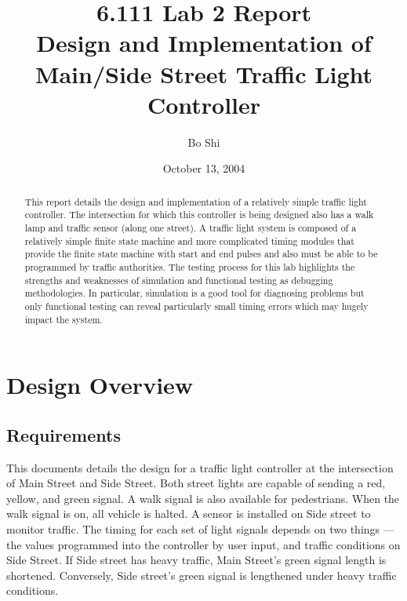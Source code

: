 \documentclass[12pt]{article}
\author{Bo Shi}
\title{6.111 Lab 2 Report \\ Design and Implementation of Main/Side Street Traffic Light Controller}
\date{October 13, 2004}
\begin{document}
\begin{titlepage}
\pagestyle{empty}
\maketitle

\begin{abstract}
This report details the design and implementation of a relatively simple
traffic light controller.  The intersection for which this controller is being
designed also has a walk lamp and traffic sensor (along one street).  A traffic
light system is composed of a relatively simple finite state machine and more
complicated timing modules that provide the finite state machine with start and
end pulses and also must be able to be programmed by traffic authorities.  The
testing process for this lab highlights the strengths and weaknesses of
simulation and functional testing as debugging methodologies.  In particular,
simulation is a good tool for diagnosing problems but only functional testing
can reveal particularly small timing errors which may hugely impact the system.
\end{abstract}
\end{titlepage}


\pagestyle{plain}
\setcounter{page}{1}
\tableofcontents

\newpage
\listoffigures 
\listoftables 

\newpage
{}
\setcounter{page}{1}
\section{Design Overview}
	\subsection{Requirements}
	This documents details the design for a traffic light controller at the
	intersection of Main Street and Side Street.  Both street lights are
	capable of sending a red, yellow, and green signal.  A walk signal is also
	available for pedestrians.  When the walk signal is on, all vehicle is
	halted.  A sensor is installed on Side street to monitor traffic.  The
	timing for each set of light signals depends on two things --- the values
	programmed into the controller by user input, and traffic conditions on
	Side Street.  If Side street has heavy traffic, Main Street's green signal
	length is shortened.  Conversely, Side street's green signal is lengthened
	under heavy traffic conditions.
\end{document}
